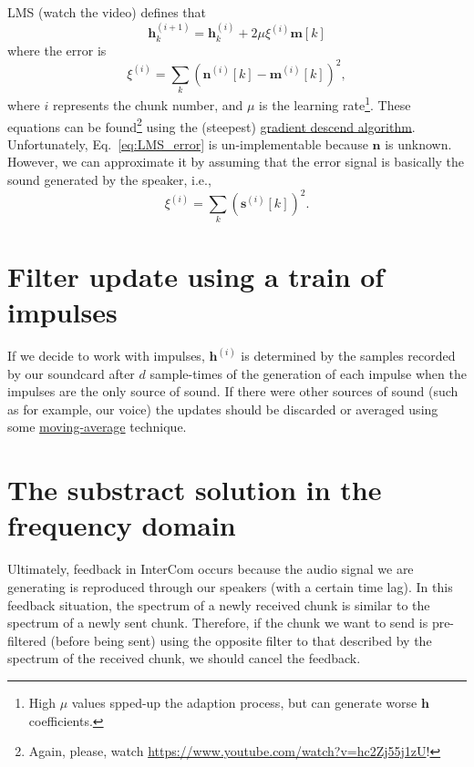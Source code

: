 LMS (watch the video) defines that
\begin{equation}
  {\mathbf h}^{(i+1)}_k = {\mathbf h}^{(i)}_k + 2\mu\xi^{(i)}{\mathbf m}[k] \label{eq:update}
\end{equation}
where the error is
\begin{equation}
  \xi^{(i)} = \sum_k({\mathbf n}^{(i)}[k] - {\mathbf m}^{(i)}[k])^2, \label{eq:LMS_error}
\end{equation}
where $i$ represents the chunk number, and $\mu$ is the learning
rate\footnote{High $\mu$ values spped-up the adaption process, but can
generate worse $\mathbf{h}$ coefficients.}.  These equations can be
found\footnote{Again, please, watch
\url{https://www.youtube.com/watch?v=hc2Zj55j1zU}!} using the
(steepest)
\href{https://en.wikipedia.org/wiki/Gradient_descent}{gradient descend
  algorithm}. Unfortunately, Eq.~\eqref{eq:LMS_error} is
un-implementable because $\mathbf{n}$ is unknown. However, we can
approximate it by assuming that the error signal is basically the
sound generated by the speaker, i.e.,
\begin{equation}
  \xi^{(i)} = \sum_k({\mathbf s}^{(i)}[k])^2. \label{eq:the_error_is_the_speaker}
\end{equation}

\section{Filter update using a train of impulses}
If we decide to work with impulses, ${\mathbf h}^{(i)}$ is determined
by the samples recorded by our soundcard after $d$ sample-times of the
generation of each impulse when the impulses are the only source of
sound. If there were other sources of sound (such as for example, our
voice) the updates should be discarded or averaged using some
\href{https://en.wikipedia.org/wiki/Moving_average}{moving-average}
technique.

\section{The substract solution in the frequency domain}
Ultimately, feedback in InterCom occurs because the audio signal we
are generating is reproduced through our speakers (with a certain time
lag). In this feedback situation, the spectrum of a newly received
chunk is similar to the spectrum of a newly sent chunk. Therefore, if
the chunk we want to send is pre-filtered (before being sent) using
the opposite filter to that described by the spectrum of the received
chunk, we should cancel the feedback.

